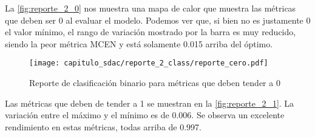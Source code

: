 \begin{table}[H]
    \centering
    \caption{Métricas de clasificación binaria}
    \label{tabla:reporte_completo_2}
    \end{table}

La \autoref{fig:reporte_2_0} nos muestra una mapa de calor que muestra las
métricas que deben ser 0 al evaluar el modelo. Podemos ver que, si bien no es
justamente 0 el valor mínimo, el rango de variación mostrado por la barra es muy
reducido, siendo la peor métrica MCEN y está solamente 0.015 arriba del óptimo.

\begin{figure}[H]
    \centering
    \texttt{[image: capitulo\_sdac/reporte\_2\_class/reporte\_cero.pdf]}
    \caption{Reporte de clasificación binario para métricas que deben tender a 0}\label{fig:reporte_2_0}
\end{figure}

Las métricas que deben de tender a 1 se muestran en la
\autoref{fig:reporte_2_1}. La variación entre el máximo y el mínimo es de 0.006. Se observa
un excelente rendimiento en estas métricas, todas arriba de 0.997.


